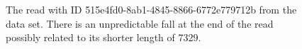 \begin{figure}
\centering

	\caption[The read with ID 515e4fd0-8ab1-4845-8866-6772e779712b from the data set.]{\label{fig:read-515}The read with ID 515e4fd0-8ab1-4845-8866-6772e779712b from the data set. There is an unpredictable fall at the end of the read possibly related to its shorter length of 7329.}
\end{figure}
